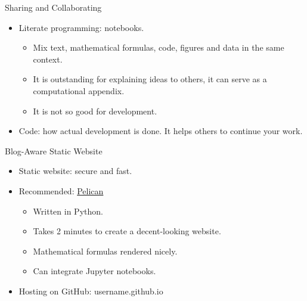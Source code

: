 \documentclass[compress,red]{beamer}\usetheme{Warsaw}\useoutertheme[subsection=false]{smoothbars}
\begin{document}
\begin{frame}{Sharing and Collaborating}
\begin{itemize}
\item Literate programming: notebooks.
\begin{itemize}
  \item Mix text, mathematical formulas, code, figures and data in the same context.
  \item It is outstanding for explaining ideas to others, it can serve as a computational appendix.
  \item It is not so good for development.
\end{itemize}
\item Code: how actual development is done. It helps others to continue your work.
\end{itemize}
\end{frame}

\begin{frame}{Blog-Aware Static Website}
\begin{itemize}
  \item Static website: secure and fast.
  \item Recommended: \href{http://blog.getpelican.com/}{Pelican}
  \begin{itemize}
     \item Written in Python.
     \item Takes 2 minutes to create a decent-looking website.
     \item Mathematical formulas rendered nicely.
     \item Can integrate Jupyter notebooks.
  \end{itemize}
  \item Hosting on GitHub: username.github.io
\end{itemize}
\end{frame}
\end{document}
